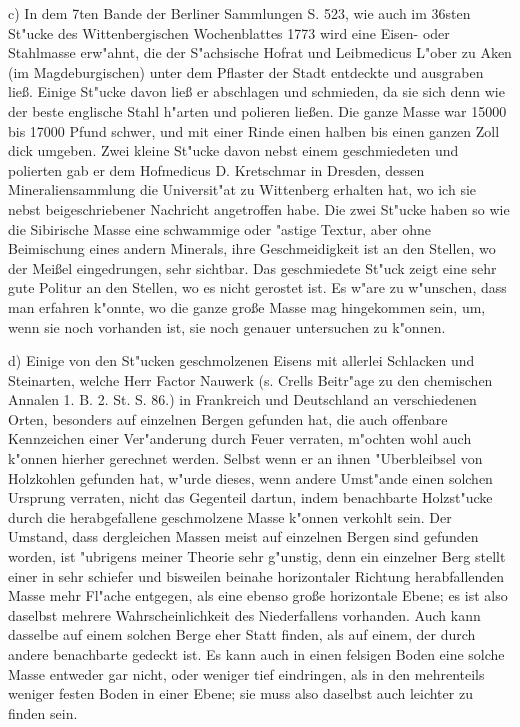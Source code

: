 \documentclass[a4paper, 11pt, oneside, polutonikogreek, german]{article}
\begin{document}
c) In dem 7ten Bande der Berliner Sammlungen S. 523, wie auch im 36sten St"ucke des Wittenbergischen Wochenblattes 1773 wird eine Eisen- oder Stahlmasse erw"ahnt, die der S"achsische Hofrat und Leibmedicus L"ober zu Aken (im Magdeburgischen) unter dem Pflaster der Stadt entdeckte und ausgraben ließ. Einige St"ucke davon ließ er abschlagen und schmieden, da sie sich denn wie der beste englische Stahl h"arten und polieren ließen. Die ganze Masse war 15000 bis 17000 Pfund schwer, und mit einer Rinde einen halben bis einen ganzen Zoll dick umgeben. Zwei kleine St"ucke davon nebst einem geschmiedeten und polierten gab er dem Hofmedicus D. Kretschmar in Dresden, dessen Mineraliensammlung die Universit"at zu Wittenberg erhalten hat, wo ich sie nebst beigeschriebener Nachricht angetroffen habe. Die zwei St"ucke haben so wie die Sibirische Masse eine schwammige oder "astige Textur, aber ohne Beimischung eines andern Minerals, ihre Geschmeidigkeit ist an den Stellen, wo der Meißel eingedrungen, sehr sichtbar. Das geschmiedete St"uck zeigt eine sehr gute Politur an den Stellen, wo es nicht gerostet ist. Es w"are zu w"unschen, dass man erfahren k"onnte, wo die ganze große Masse mag hingekommen sein, um, wenn sie noch vorhanden ist, sie noch genauer untersuchen zu k"onnen.

d) Einige von den St"ucken geschmolzenen Eisens mit allerlei Schlacken und Steinarten, welche Herr Factor Nauwerk (s. Crells Beitr"age zu den chemischen Annalen 1. B. 2. St. S. 86.) in Frankreich und Deutschland an verschiedenen Orten, besonders auf einzelnen Bergen gefunden hat, die auch offenbare Kennzeichen einer Ver"anderung durch Feuer verraten, m"ochten wohl auch k"onnen hierher gerechnet werden. Selbst wenn er an ihnen "Uberbleibsel von Holzkohlen gefunden hat, w"urde dieses, wenn andere Umst"ande einen solchen Ursprung verraten, nicht das Gegenteil dartun, indem benachbarte Holzst"ucke durch die herabgefallene geschmolzene Masse k"onnen verkohlt sein. Der Umstand, dass dergleichen Massen meist auf einzelnen Bergen sind gefunden worden, ist "ubrigens meiner Theorie sehr g"unstig, denn ein einzelner Berg stellt einer in sehr schiefer und bisweilen beinahe horizontaler Richtung herabfallenden Masse mehr Fl"ache entgegen, als eine ebenso große horizontale Ebene; es ist also daselbst mehrere Wahrscheinlichkeit des Niederfallens vorhanden. Auch kann dasselbe auf einem solchen Berge eher Statt finden, als auf einem, der durch andere benachbarte gedeckt ist. Es kann auch in einen felsigen Boden eine solche Masse entweder gar nicht, oder weniger tief eindringen, als in den mehrenteils weniger festen Boden in einer Ebene; sie muss also daselbst auch leichter zu finden sein.
\clearpage
\end{document}
